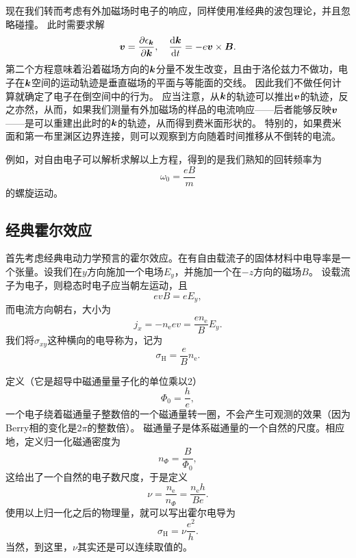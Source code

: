 现在我们转而考虑有外加磁场时电子的响应，同样使用准经典的波包理论，并且忽略碰撞。
此时需要求解
\begin{equation}
    \vb*{v} = \pdv{\epsilon_{\vb*{k}}}{\vb*{k}}, \quad \dv{\vb*{k}}{t} = -e \vb*{v} \times \vb*{B}.
    \label{eq:calssical-magnetic-field}
\end{equation}
第二个方程意味着沿着磁场方向的$\vb*{k}$分量不发生改变，且由于洛伦兹力不做功，电子在$\vb*{k}$空间的运动轨迹是垂直磁场的平面与等能面的交线。
因此我们不做任何计算就确定了电子在倒空间中的行为。
应当注意，从$\vb*{k}$的轨迹可以推出$\vb*{v}$的轨迹，反之亦然，从而，如果我们测量有外加磁场的样品的电流响应——后者能够反映$\vb*{v}$——是可以重建出此时的$\vb*{k}$的轨迹，从而得到费米面形状的。
特别的，如果费米面和第一布里渊区边界连接，则可以观察到方向随着时间推移从不倒转的电流。

例如，对自由电子可以解析求解以上方程，得到的是我们熟知的回转频率为
\begin{equation}
    \omega_0 = \frac{e B}{m}
\end{equation}
的螺旋运动。

\subsection{经典霍尔效应}\label{sec:classical-hall-effect}

首先考虑经典电动力学预言的霍尔效应。在有自由载流子的固体材料中电导率是一个张量。设我们在$y$方向施加一个电场$E_y$，并施加一个在$-z$方向的磁场$B$。
设载流子为电子，则稳态时电子应当朝左运动，且
\[
    e v B = e E_y,
\]
而电流方向朝右，大小为
\[
    j_x = - n_\text{e} e v = \frac{e n_\text{e}}{B} E_y.
\]
我们将$\sigma_{xy}$这种横向的电导称为，记为
\begin{equation}
    \sigma_\text{H} = \frac{e}{B} n_\text{e}.
\end{equation}

定义（它是超导中磁通量量子化的单位乘以2）
\begin{equation}
    \Phi_0 = \frac{h}{e},
\end{equation}
一个电子绕着磁通量子整数倍的一个磁通量转一圈，不会产生可观测的效果（因为Berry相的变化是$2\pi$的整数倍）。
磁通量子是体系磁通量的一个自然的尺度。相应地，定义归一化磁通密度为
\begin{equation}
    n_{\Phi} = \frac{B}{\Phi_0},
\end{equation}
这给出了一个自然的电子数尺度，于是定义
\begin{equation}
    \nu = \frac{n_\text{e}}{n_\Phi} = \frac{n_\text{e} h}{B e}.
\end{equation}
使用以上归一化之后的物理量，就可以写出霍尔电导为
\begin{equation}
    \sigma_\text{H} = \nu \frac{e^2}{h}.
    \label{eq:classical-hall-conductivity}
\end{equation}
当然，到这里，$\nu$其实还是可以连续取值的。

